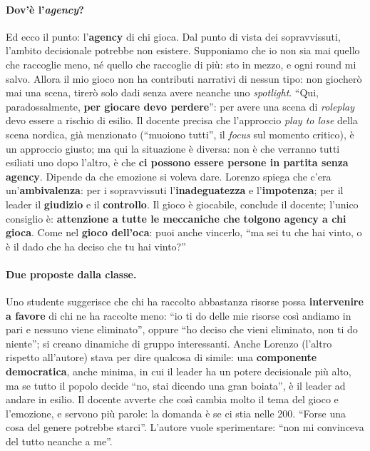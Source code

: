 \paragraph{Dov'è l'\emph{agency}?} Ed ecco il punto: l'\textbf{agency} di chi gioca.
Dal punto di vista dei sopravvissuti, l'ambito decisionale potrebbe non esistere.
Supponiamo che io non sia mai quello che raccoglie meno, né quello che raccoglie di
più: sto in mezzo, e ogni round mi salvo. Allora il mio gioco non ha contributi
narrativi di nessun tipo: non giocherò mai una scena, tirerò solo dadi senza avere
neanche uno \emph{spotlight}. ``Qui, paradossalmente, \textbf{per giocare devo
perdere}'': per avere una scena di \emph{roleplay} devo essere a rischio di esilio. Il
docente precisa che l'approccio \emph{play to lose} della scena nordica, già
menzionato (``muoiono tutti'', il \emph{focus} sul momento critico), è un approccio
giusto; ma qui la situazione è diversa: non è che verranno tutti esiliati uno dopo
l'altro, è che \textbf{ci possono essere persone in partita senza agency}. Dipende da
che emozione si voleva dare. Lorenzo spiega che c'era un'\textbf{ambivalenza}: per i
sopravvissuti l'\textbf{inadeguatezza} e l'\textbf{impotenza}; per il leader il
\textbf{giudizio} e il \textbf{controllo}. Il gioco è giocabile, conclude il docente;
l'unico consiglio è: \textbf{attenzione a tutte le meccaniche che tolgono agency a chi
gioca}. Come nel \textbf{gioco dell'oca}: puoi anche vincerlo, ``ma sei tu che hai
vinto, o è il dado che ha deciso che tu hai vinto?''

\paragraph{Due proposte dalla classe.} Uno studente suggerisce che chi ha raccolto
abbastanza risorse possa \textbf{intervenire a favore} di chi ne ha raccolte meno:
``io ti do delle mie risorse così andiamo in pari e nessuno viene eliminato'', oppure
``ho deciso che vieni eliminato, non ti do niente''; si creano dinamiche di gruppo
interessanti. Anche Lorenzo (l'altro rispetto all'autore) stava per dire qualcosa di
simile: una \textbf{componente democratica}, anche minima, in cui il leader ha un
potere decisionale più alto, ma se tutto il popolo decide ``no, stai dicendo una gran
boiata'', è il leader ad andare in esilio. Il docente avverte che così cambia molto
il tema del gioco e l'emozione, e servono più parole: la domanda è se ci stia nelle
200. ``Forse una cosa del genere potrebbe starci''. L'autore vuole sperimentare:
``non mi convinceva del tutto neanche a me''.

